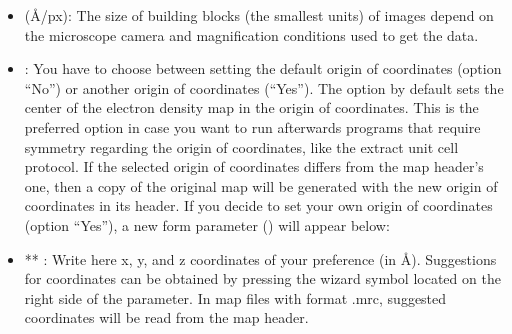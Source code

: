\begin{itemize}
\begin{itemize}
\begin{itemize}
\begin{itemize}
                                \item {} (\AA/px): The size of building blocks (the smallest units) of images depend on the microscope camera and magnification conditions used to get the data.
                                \item {}: You have to choose between setting the default origin of coordinates (option ``No'') or another origin of coordinates (``Yes''). The option by default sets the center of the electron density map in the origin of coordinates. This is the preferred option in case you want to run afterwards programs that require symmetry regarding the origin of coordinates, like the extract unit cell protocol. If the selected origin of coordinates differs from the map header's one, then a copy of the original map will be generated with the new origin of coordinates in its header. If you decide to set your own origin of coordinates (option ``Yes''), a new form parameter () will appear below:
                                    
                                    \item ** : Write here x, y, and z coordinates of your preference (in \AA). Suggestions for coordinates can be obtained by pressing the wizard symbol located on the right side of the  parameter. In map files with format .mrc, suggested coordinates will be read from the map header.
                                    
                               \end{itemize}
                    

\end{itemize}
\end{itemize}
\end{itemize}
